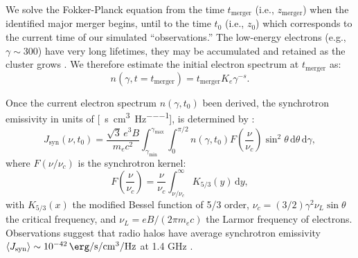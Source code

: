 \documentclass[modern]{aastex61}
\newcommand{\R}[1]{\mathrm{#1}}
\newcommand{\D}[1]{\R{d} #1}
\begin{document}
We solve the Fokker-Planck equation from the time $t_{\R{merger}}$
(i.e., $z_{\R{merger}}$) when the identified major merger begins,
until to the time $t_0$ (i.e., $z_0$) which corresponds to the current
time of our simulated ``observations.''
The low-energy electrons (e.g., $\gamma \sim 300$) have very long
lifetimes, they may be accumulated and retained as the cluster
grows \citep{sarazin1999}.
We therefore estimate the initial electron spectrum at $t_{\R{merger}}$ as:
\begin{equation}
  \label{eq:ne-init}
  n(\gamma, t=t_{\R{merger}}) = t_{\R{merger}} K_e \gamma^{-s}.
\end{equation}

Once the current electron spectrum $n(\gamma, t_0)$ been derived,
the synchrotron emissivity in units of
[\si{\erg\per\second\per\cm\cubed\per\hertz}],
is determined by \citep{rybicki1979}:
\begin{equation}
  \label{sec:jnu-sync}
  J_{\R{syn}}(\nu, t_0) = \frac{\sqrt{3} \, e^3 B}{m_e c^2}
  \int_{\gamma_{\R{min}}}^{\gamma_{\R{max}}} \int_0^{\pi/2}
  n(\gamma, t_0) F\!\left( \frac{\nu}{\nu_c} \right) \sin^2 \!\theta
  \,\D{\theta} \,\D{\gamma},
\end{equation}
where $F(\nu/\nu_c)$ is the synchrotron kernel:
\begin{equation}
  \label{eq:sync-kernel}
  F\!\left( \frac{\nu}{\nu_c} \right) = \frac{\nu}{\nu_c}
  \int_{\nu/\nu_c}^{\infty} K_{5/3}(y) \,\D{y},
\end{equation}
with $K_{5/3}(x)$ the modified Bessel function of 5/3 order,
$\nu_c = (3/2) \gamma^2 \nu_L \sin\theta$ the critical frequency,
and $\nu_L = e B / (2\pi m_e c)$ the Larmor frequency of electrons.
Observations suggest that radio halos have average synchrotron emissivity
$\langle {J_{\R{syn}}} \rangle \sim \SI{e-42}{\erg\per\second\per\cm\cubed\per\hertz}$
at 1.4 GHz \citep{murgia2009,feretti2012rev}.
\end{document}
